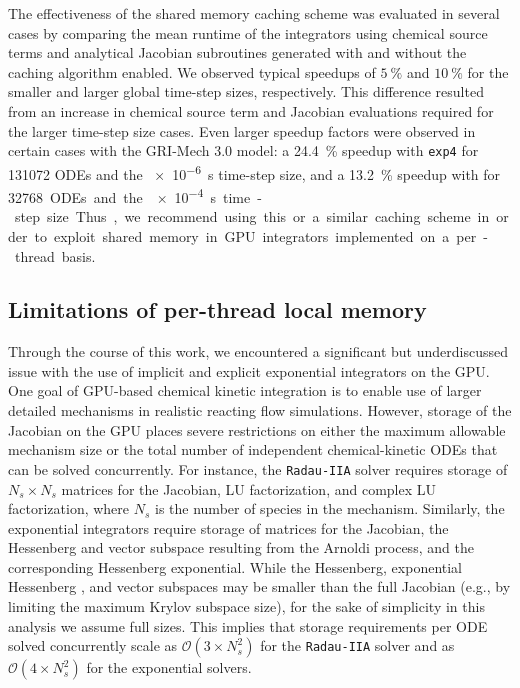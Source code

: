 \documentclass[final,twocolumn]{elsarticle}
\begin{document}
The effectiveness of the shared memory caching scheme was evaluated in several cases by comparing the mean runtime of the integrators using chemical source terms and analytical Jacobian subroutines generated with and without the caching algorithm enabled.
We observed typical speedups of $\SI{5}{\percent}$ and $\SI{10}{\percent}$ for the smaller and larger global time-step sizes, respectively.
This difference resulted from an increase in chemical source term and Jacobian evaluations required for the larger time-step size cases.
Even larger speedup factors were observed in certain cases with the GRI-Mech 3.0 model: a \SI{24.4}{\percent} speedup with \texttt{exp4} for \num{131072} ODEs and the \SI{e-6}{\second} time-step size, and a \SI{13.2}{\percent} speedup with  for \SI{32768} ODEs and the \SI{e-4}{\second} time-step size.
Thus, we recommend using this or a similar caching scheme in order to exploit shared memory in GPU integrators implemented on a per-thread basis.

\subsection{Limitations of per-thread local memory}

Through the course of this work, we encountered a significant but underdiscussed issue with the use of implicit and explicit exponential integrators on the GPU.
One goal of GPU-based chemical kinetic integration is to enable use of larger detailed mechanisms in realistic reacting flow simulations.
However, storage of the Jacobian on the GPU places severe restrictions on either the maximum allowable mechanism size or the total number of independent chemical-kinetic ODEs that can be solved concurrently.
For instance, the \texttt{Radau-IIA} solver requires storage of $N_s \times N_s$ matrices for the Jacobian, LU factorization, and complex LU factorization, where $N_s$ is the number of species in the mechanism.
Similarly, the exponential integrators require storage of matrices for the Jacobian, the Hessenberg and vector subspace resulting from the Arnoldi process, and the corresponding Hessenberg exponential.
While the Hessenberg, exponential Hessenberg , and vector subspaces may be smaller than the full Jacobian (e.g., by limiting the maximum Krylov subspace size), for the sake of simplicity in this analysis we assume full sizes.
This implies that storage requirements per ODE solved concurrently scale as $\mathcal{O}\left(3 \times N_s^2\right)$ for the \texttt{Radau-IIA} solver and as $\mathcal{O}\left(4 \times N_s^2\right)$ for the exponential solvers.
\end{document}
